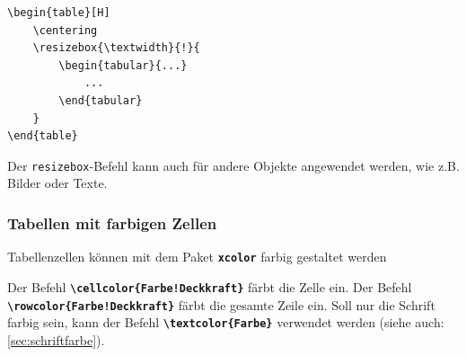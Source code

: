 \begin{lstlisting}[language={[LaTeX]TeX}]
\begin{table}[H]
    \centering
    \resizebox{\textwidth}{!}{
        \begin{tabular}{...}
            ... 
        \end{tabular}
    }
\end{table}
    \end{lstlisting}

Der \texttt{resizebox}-Befehl kann auch für andere Objekte angewendet werden, wie z.B. Bilder oder Texte.

\subsubsection{Tabellen mit farbigen Zellen}
Tabellenzellen können mit dem Paket \textbf{\texttt{xcolor}} farbig gestaltet werden

Der Befehl \textbf{\texttt{\textbackslash cellcolor\{Farbe!Deckkraft\}}} färbt die Zelle ein. Der Befehl \textbf{\texttt{\textbackslash rowcolor\{Farbe!Deckkraft\}}} färbt die gesamte Zeile ein. Soll nur die Schrift farbig sein, kann der Befehl \textbf{\texttt{\textbackslash textcolor\{Farbe\}}} verwendet werden (siehe auch: \ref{sec:schriftfarbe}).

